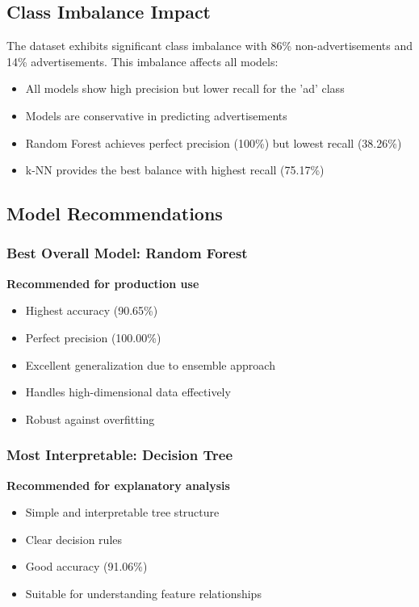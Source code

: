 \subsection{Class Imbalance Impact}

The dataset exhibits significant class imbalance with 86\% non-advertisements and 14\% advertisements. This imbalance affects all models:

\begin{itemize}
    \item All models show high precision but lower recall for the 'ad' class
    \item Models are conservative in predicting advertisements
    \item Random Forest achieves perfect precision (100\%) but lowest recall (38.26\%)
    \item k-NN provides the best balance with highest recall (75.17\%)
\end{itemize}

\subsection{Model Recommendations}

\subsubsection{Best Overall Model: Random Forest}
\textbf{Recommended for production use}
\begin{itemize}
    \item Highest accuracy (90.65\%)
    \item Perfect precision (100.00\%)
    \item Excellent generalization due to ensemble approach
    \item Handles high-dimensional data effectively
    \item Robust against overfitting
\end{itemize}

\subsubsection{Most Interpretable: Decision Tree}
\textbf{Recommended for explanatory analysis}
\begin{itemize}
    \item Simple and interpretable tree structure
    \item Clear decision rules
    \item Good accuracy (91.06\%)
    \item Suitable for understanding feature relationships
\end{itemize}

